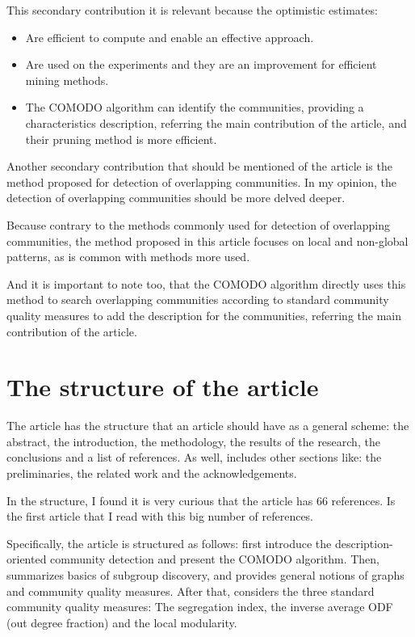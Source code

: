 \documentclass[a4paper]{article}
\begin{document}
This secondary contribution it is relevant because the optimistic estimates:

\begin{itemize}
	\item Are efficient to compute and enable an effective approach.
	\item Are used on the experiments and they are an improvement for efficient mining methods.
	\item The COMODO algorithm can identify the communities, providing a characteristics description, referring the main contribution of the article, and their pruning method is more efficient.
\end{itemize}

Another secondary contribution that should be mentioned of the article is the method proposed for detection of overlapping communities. In my opinion, the detection of overlapping communities should be more delved deeper.
\vskip 0.35cm

Because contrary to the methods commonly used for detection of overlapping communities, the method proposed in this article focuses on local and non-global patterns, as is common with methods more used.
\vskip 0.35cm

And it is important to note too, that the COMODO algorithm directly uses this method to search overlapping communities according to standard community quality measures to add the description for the communities, referring the main contribution of the article.

\section*{The structure of the article}
The article has the structure that an article should have as a general scheme: the abstract, the introduction, the methodology, the results of the research, the conclusions and a list of references. As well, includes other sections like: the preliminaries, the related work and the acknowledgements.
\vskip 0.35cm

In the structure, I found it is very curious that the article has 66 references. Is the first article that I read with this big number of references.
\vskip 0.35cm

Specifically, the article is structured as follows: first introduce the description-oriented community detection and present the COMODO algorithm. Then, summarizes basics of subgroup discovery, and provides general notions of graphs and community quality measures. After that, considers the three standard community quality measures: The segregation index, the inverse average ODF (out degree fraction) and the local modularity.
\vskip 0.35cm
\end{document}
